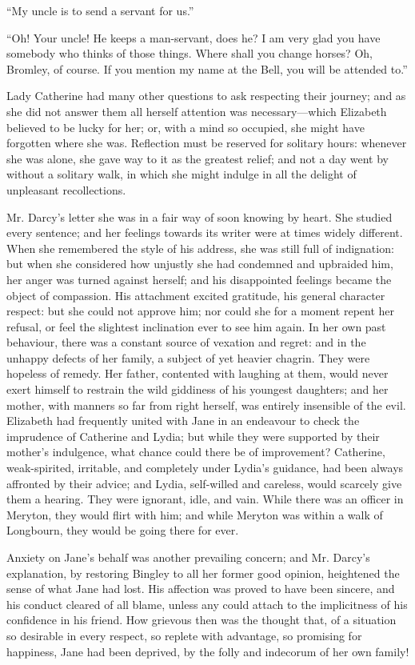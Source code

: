 ``My uncle is to send a servant for us.''

``Oh! Your uncle! He keeps a man-servant, does he? I am very glad you have somebody who thinks of those things. Where shall you change horses? Oh, Bromley, of course. If you mention my name at the Bell, you will be attended to.''

Lady Catherine had many other questions to ask respecting their journey; and as she did not answer them all herself attention was necessary---which Elizabeth believed to be lucky for her; or, with a mind so occupied, she might have forgotten where she was. Reflection must be reserved for solitary hours: whenever she was alone, she gave way to it as the greatest relief; and not a day went by without a solitary walk, in which she might indulge in all the delight of unpleasant recollections.

Mr. Darcy's letter she was in a fair way of soon knowing by heart. She studied every sentence; and her feelings towards its writer were at times widely different. When she remembered the style of his address, she was still full of indignation: but when she considered how unjustly she had condemned and upbraided him, her anger was turned against herself; and his disappointed feelings became the object of compassion. His attachment excited gratitude, his general character respect: but she could not approve him; nor could she for a moment repent her refusal, or feel the slightest inclination ever to see him again. In her own past behaviour, there was a constant source of vexation and regret: and in the unhappy defects of her family, a subject of yet heavier chagrin. They were hopeless of remedy. Her father, contented with laughing at them, would never exert himself to restrain the wild giddiness of his youngest daughters; and her mother, with manners so far from right herself, was entirely insensible of the evil. Elizabeth had frequently united with Jane in an endeavour to check the imprudence of Catherine and Lydia; but while they were supported by their mother's indulgence, what chance could there be of improvement? Catherine, weak-spirited, irritable, and completely under Lydia's guidance, had been always affronted by their advice; and Lydia, self-willed and careless, would scarcely give them a hearing. They were ignorant, idle, and vain. While there was an officer in Meryton, they would flirt with him; and while Meryton was within a walk of Longbourn, they would be going there for ever.

Anxiety on Jane's behalf was another prevailing concern; and Mr. Darcy's explanation, by restoring Bingley to all her former good opinion, heightened the sense of what Jane had lost. His affection was proved to have been sincere, and his conduct cleared of all blame, unless any could attach to the implicitness of his confidence in his friend. How grievous then was the thought that, of a situation so desirable in every respect, so replete with advantage, so promising for happiness, Jane had been deprived, by the folly and indecorum of her own family!

